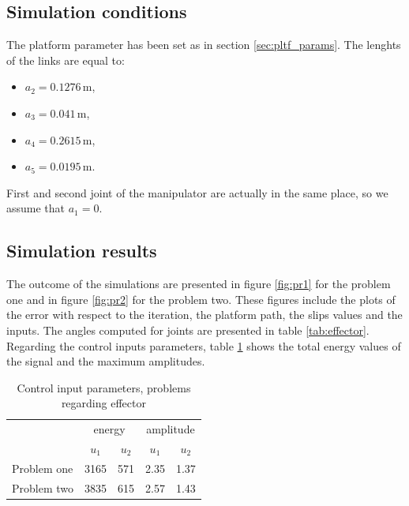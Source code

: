\subsection{Simulation conditions}
The platform parameter has been set as in section \ref{sec:pltf_params}. The lenghts of the links
are equal to:
\begin{multicols}{2}
\begin{itemize}
\item $a_2=0.1276 \,\mathrm{m}$,
\item $a_3=0.041 \,\mathrm{m}$,
\item $a_4=0.2615 \,\mathrm{m}$,
\item $a_5=0.0195 \,\mathrm{m}$.
\end{itemize}
\end{multicols}
First and second joint of the manipulator are actually in the same place, so we assume that $a_1=0$.

\subsection{Simulation results}
The outcome of the simulations are presented in figure \ref{fig:pr1} for the problem one and in figure
\ref{fig:pr2} for the problem two. These figures include the plots of the error with respect to the
iteration, the platform path, the slips values and the inputs. The angles computed for joints are
presented in table \ref{tab:effector}. Regarding the control inputs parameters, table \ref{tab:in_eff}
shows the total energy values of the signal and the maximum amplitudes.

\begin{table}[htb]
\caption{Control input parameters, problems regarding effector}
\label{tab:in_eff}
\centering
\begin{tabular}{l|l|l|l|l|}
\cline{2-5}
\multicolumn{1}{c|}{}             & \multicolumn{2}{c|}{energy}                             & \multicolumn{2}{c|}{amplitude}                          \\ \cline{2-5} 
\multicolumn{1}{c|}{}             & \multicolumn{1}{c|}{$u_1$} & \multicolumn{1}{c|}{$u_2$} & \multicolumn{1}{c|}{$u_1$} & \multicolumn{1}{c|}{$u_2$} \\ \hline
\multicolumn{1}{|l|}{Problem one} & 3165                       & 571                        & 2.35                       & 1.37                       \\ \hline
\multicolumn{1}{|l|}{Problem two} & 3835                       & 615                        & 2.57                       & 1.43                       \\ \hline
\end{tabular}
\end{table}

